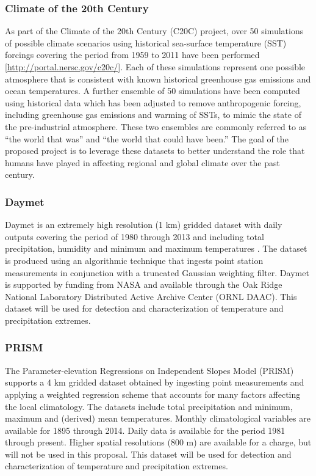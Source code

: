 \documentclass[11pt]{article}
\newcommand\citep{\cite}
\begin{document}
\subsubsection*{Climate of the 20th Century} \label{sec:EnsembleData}

As part of the Climate of the 20th Century (C20C) project, over 50 simulations of possible climate scenarios using historical sea-surface temperature (SST) forcings covering the period from 1959 to 2011 have been performed [\url{http://portal.nersc.gov/c20c/}].  Each of these simulations represent one possible atmosphere that is consistent with known historical greenhouse gas emissions and ocean temperatures.  A further ensemble of 50 simulations have been computed using historical data which has been adjusted to remove anthropogenic forcing, including greenhouse gas emissions and warming of SSTs, to mimic the state of the pre-industrial atmosphere.  These two ensembles are commonly referred to as ``the world that was'' and ``the world that could have been.''  The goal of the proposed project is to leverage these datasets to better understand the role that humans have played in affecting regional and global climate over the past century.

\subsubsection*{Daymet} \label{sec:DAYMET}

Daymet is an extremely high resolution (1 km) gridded dataset with daily outputs covering the period of 1980 through 2013 and including total precipitation, humidity and minimum and maximum temperatures \citep{thornton1997generating, thornton1999improved, thornton2000simultaneous}.  The dataset is produced using an algorithmic technique that ingests point station measurements in conjunction with a truncated Gaussian weighting filter.  Daymet is supported by funding from NASA and available through the Oak Ridge National Laboratory Distributed Active Archive Center (ORNL DAAC).  This dataset will be used for detection and characterization of temperature and precipitation extremes.

\subsubsection*{PRISM} \label{sec:PRISM}

The Parameter-elevation Regressions on Independent Slopes Model (PRISM) \citep{daly2008physiographically} supports a 4 km gridded dataset obtained by ingesting point measurements and applying a weighted regression scheme that accounts for many factors affecting the local climatology.  The datasets include total precipitation and minimum, maximum and (derived) mean temperatures.  Monthly climatological variables are available for 1895 through 2014.  Daily data is available for the period 1981 through present.  Higher spatial resolutions (800 m) are available for a charge, but will not be used in this proposal.  This dataset will be used for detection and characterization of temperature and precipitation extremes.
\end{document}
